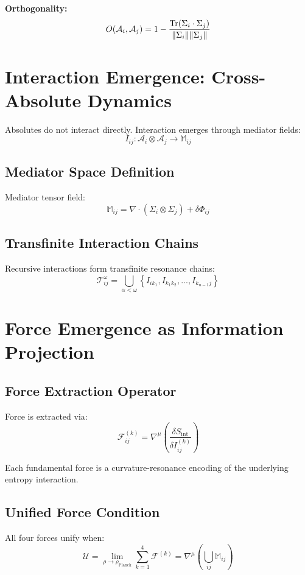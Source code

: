 \documentclass[11pt]{article}
\begin{document}
\textbf{Orthogonality:}
\[
O(\mathcal{A}_i, \mathcal{A}_j) = 1 - \frac{\Tr(\Sigma_i \cdot \Sigma_j)}{\|\Sigma_i\| \|\Sigma_j\|}
\]

\section{Interaction Emergence: Cross-Absolute Dynamics}

Absolutes do not interact directly. Interaction emerges through mediator fields:
\[
I_{ij} : \mathcal{A}_i \otimes \mathcal{A}_j \to \mathbb{M}_{ij}
\]

\subsection{Mediator Space Definition}

Mediator tensor field:
\[
\mathbb{M}_{ij} = \nabla \cdot (\Sigma_i \otimes \Sigma_j) + \delta \Phi_{ij}
\]

\subsection{Transfinite Interaction Chains}

Recursive interactions form transfinite resonance chains:
\[
\mathcal{T}^{\omega}_{ij} = \bigcup_{\alpha < \omega} \left\{ I_{i k_1}, I_{k_1 k_2}, ..., I_{k_{n-1} j} \right\}
\]

\section{Force Emergence as Information Projection}

\subsection{Force Extraction Operator}

Force is extracted via:
\[
\mathscr{F}_{ij}^{(k)} = \nabla^\mu \left( \frac{\delta S_{\text{int}}}{\delta I_{ij}^{(k)}} \right)
\]

Each fundamental force is a curvature-resonance encoding of the underlying entropy interaction.

\subsection{Unified Force Condition}

All four forces unify when:
\[
\mathscr{U} = \lim_{\rho \to \rho_{\text{Planck}}} \sum_{k=1}^4 \mathscr{F}^{(k)} = \nabla^\mu \left( \bigcup_{ij} \mathbb{M}_{ij} \right)
\]
\end{document}
